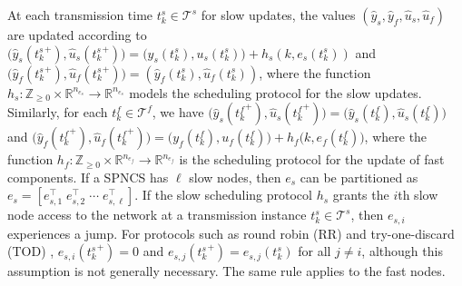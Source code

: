 At each transmission time $t_k^s \in \mathcal{T}^s$ for slow updates, the values $(\hat{y}_s,\hat{y}_f,\hat{u}_s,\hat{u}_f) $ are updated according to
$
\big(\hat{y}_s ( {t_k^s}^{+}),\hat{u}_s ( {t_k^s}^{+} )\big)
    =
    \big(
    y_s(t_k^s), u_s(t_k^s)
    \big)+ h_s(k, e_{s}(t_k^s) )
$
and
$
\big(\hat{y}_f ( {t_k^s}^{+} ), 
    \hat{u}_f ( {t_k^s}^{+})
    \big)
    =
    \left(
    \hat{y}_f(t_k^s), \hat{u}_f(t_k^s)
    \right)
$,
%
where the function $h_s: \mathbb{Z}_{\geq 0}\times \mathbb{R}^{n_{e_s}}  \rightarrow \mathbb{R}^{n_{e_s}}$ models the scheduling protocol \cite{dragan_stability} for the slow updates.
%
Similarly, for each $t_k^f \in \mathcal{T}^f$, we have 
$
\big(
    \hat{y}_s ( {t_k^f}^{+} ), 
    \hat{u}_s ( {t_k^f}^{+})
    \big)
    =
    \big(
    \hat{y}_s(t_k^f), \hat{u}_s(t_k^f)
    \big)
$
and
$\big(
    \hat{y}_f ( {t_k^f}^{+} ), 
    \hat{u}_f ( {t_k^f}^{+} )
    \big)
    =
    \big(
    y_f(t_k^f), u_f(t_k^f)
    \big) 
    + h_f\big(k, e_{f}(t_k^f) \big)$,
%
where the function $h_f: \mathbb{Z}_{\geq 0}\times \mathbb{R}^{n_{e_f}} \rightarrow \mathbb{R}^{n_{e_f}} $ is the scheduling protocol for the update of fast components. 
%
If a SPNCS has $\ell$ slow nodes, then $e_s$ can be partitioned as $e_s = [e_{s,1}^\top \; e_{s,2}^\top \; \cdots \; e_{s,\ell}^\top]$. If the slow scheduling protocol $h_s$ grants the $i$th slow node access to the network at a transmission instance $t_k^s \in \mathcal{T}^s$, then $e_{s,i}$ experiences a jump. For protocols such as round robin (RR) and try-one-discard (TOD) \cite{dragan_stability}, $e_{s,i}({t_k^s}^+) = 0$ and $e_{s,j}({t_k^s}^+) = e_{s,j}({t_k^s})$ for all $j \neq i$, although this assumption is not generally necessary. The same rule applies to the fast nodes. 




